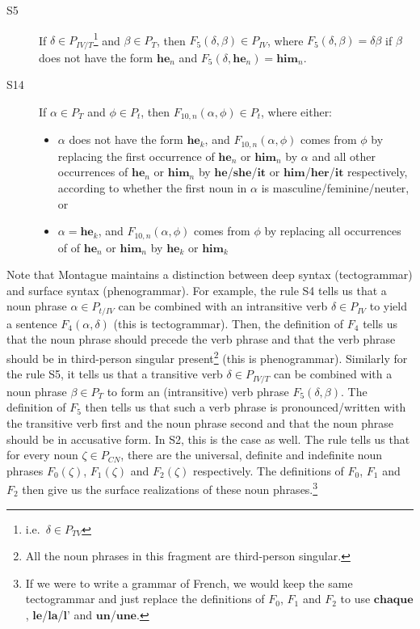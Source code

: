 \begin{description}
\item[S5] If $\delta \in P_{IV / T}$\footnote{i.e.\ $\delta \in P_{TV}$}
  and $\beta \in P_{T}$, then $F_5(\delta, \beta) \in P_{IV}$, where
  $F_5(\delta, \beta) = \delta \beta$ if $\beta$ does not have the form
  $\textbf{he}_n$ and $F_5(\delta, \textbf{he}_n) = \textbf{him}_n$.

\item[S14] If $\alpha \in P_{T}$ and $\phi \in P_{t}$, then
  $F_{10,n}(\alpha, \phi) \in P_{t}$, where either:

  \begin{itemize}
  \item $\alpha$ does not have the form $\textbf{he}_k$, and
    $F_{10,n}(\alpha, \phi)$ comes from $\phi$ by replacing the first
    occurrence of $\textbf{he}_n$ or $\textbf{him}_n$ by $\alpha$ and all
    other occurrences of $\textbf{he}_n$ or $\textbf{him}_n$ by
    $\textbf{he}$/$\textbf{she}$/$\textbf{it}$ or
    $\textbf{him}$/$\textbf{her}$/$\textbf{it}$ respectively, according to
    whether the first noun in $\alpha$ is masculine/feminine/neuter, or
  \item $\alpha = \textbf{he}_k$, and $F_{10,n}(\alpha, \phi)$ comes from
    $\phi$ by replacing all occurrences of of $\textbf{he}_n$ or
    $\textbf{him}_n$ by $\textbf{he}_k$ or $\textbf{him}_k$
  \end{itemize}
\end{description}

Note that Montague maintains a distinction between deep syntax
(tectogrammar) and surface syntax (phenogrammar). For example, the rule S4
tells us that a noun phrase $\alpha \in P_{t / IV}$ can be combined with an
intransitive verb $\delta \in P_{IV}$ to yield a sentence
$F_4(\alpha, \delta)$ (this is tectogrammar). Then, the definition of $F_4$
tells us that the noun phrase should precede the verb phrase and that the
verb phrase should be in third-person singular present\footnote{All the
  noun phrases in this fragment are third-person singular.} (this is
phenogrammar). Similarly for the rule S5, it tells us that a transitive
verb $\delta \in P_{IV / T}$ can be combined with a noun phrase
$\beta \in P_{T}$ to form an (intransitive) verb phrase
$F_5(\delta, \beta)$. The definition of $F_5$ then tells us that such a
verb phrase is pronounced/written with the transitive verb first and the
noun phrase second and that the noun phrase should be in accusative
form. In S2, this is the case as well. The rule tells us that for every
noun $\zeta \in P_{CN}$, there are the universal, definite and indefinite
noun phrases $F_0(\zeta)$, $F_1(\zeta)$ and $F_2(\zeta)$ respectively. The
definitions of $F_0$, $F_1$ and $F_2$ then give us the surface realizations
of these noun phrases.\footnote{If we were to write a grammar of French, we
  would keep the same tectogrammar and just replace the definitions of
  $F_0$, $F_1$ and $F_2$ to use $\textbf{chaque}$,
  $\textbf{le}$/$\textbf{la}$/$\textbf{l'}$ and
  $\textbf{un}$/$\textbf{une}$.}


